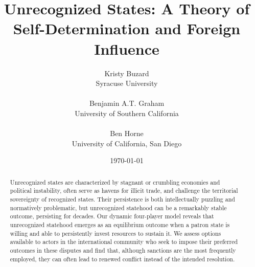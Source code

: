 \documentclass[11pt,letterpaper, notitlepage]{article}
\title{Unrecognized States: A Theory of Self-Determination and Foreign Influence}
\author{Kristy Buzard\\
Syracuse University\\
\\
Benjamin A.T. Graham \\
University of Southern California\\
\\
Ben Horne\\ 
University of California, San Diego}
\date{\today}
\begin{document}
\begin{titlepage}
\maketitle
\thispagestyle{empty}

\begin{abstract}
\noindent Unrecognized states are characterized by stagnant or crumbling economies and political instability, often serve as havens for illicit trade, and challenge the territorial sovereignty of recognized states. Their persistence is both intellectually puzzling and normatively problematic, but unrecognized statehood can be a remarkably stable outcome, persisting for decades. Our dynamic four-player model reveals that unrecognized statehood emerges as an equilibrium outcome when a patron state is willing and able to persistently invest resources to sustain it. %
We assess options available to actors in the international community who seek to impose their preferred outcomes in these disputes and find that, although sanctions are the most frequently employed, they can often lead to renewed conflict instead of the intended resolution.
\end{abstract}

\end{titlepage}
\setcounter{page}{1}

\doublespacing
\end{document}
